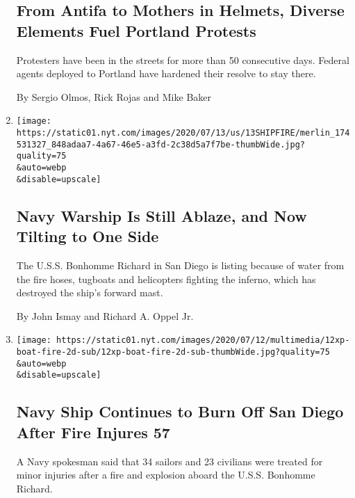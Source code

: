 \begin{enumerate}
  \hypertarget{from-antifa-to-mothers-in-helmets-diverse-elements-fuel-portland-protests}{%
  \subsection{From Antifa to Mothers in Helmets, Diverse Elements Fuel
  Portland
  Protests}\label{from-antifa-to-mothers-in-helmets-diverse-elements-fuel-portland-protests}}

  Protesters have been in the streets for more than 50 consecutive days.
  Federal agents deployed to Portland have hardened their resolve to
  stay there.

  By Sergio Olmos, Rick Rojas and Mike Baker
\item
  \href{/2020/07/13/us/naval-ship-fire-san-diego.html}{}

  \texttt{[image: https://static01.nyt.com/images/2020/07/13/us/13SHIPFIRE/merlin\_174531327\_848adaa7-4a67-46e5-a3fd-2c38d5a7f7be-thumbWide.jpg?quality=75\\\&auto=webp\\\&disable=upscale]}

  \hypertarget{navy-warship-is-still-ablaze-and-now-tilting-to-one-side}{%
  \subsection{Navy Warship Is Still Ablaze, and Now Tilting to One
  Side}\label{navy-warship-is-still-ablaze-and-now-tilting-to-one-side}}

  The U.S.S. Bonhomme Richard in San Diego is listing because of water
  from the fire hoses, tugboats and helicopters fighting the inferno,
  which has destroyed the ship's forward mast.

  By John Ismay and Richard A. Oppel Jr.
\item
  \href{/2020/07/12/us/naval-ship-fire-san-diego.html}{}

  \texttt{[image: https://static01.nyt.com/images/2020/07/12/multimedia/12xp-boat-fire-2d-sub/12xp-boat-fire-2d-sub-thumbWide.jpg?quality=75\\\&auto=webp\\\&disable=upscale]}

  \hypertarget{navy-ship-continues-to-burn-off-san-diego-after-fire-injures-57}{%
  \subsection{Navy Ship Continues to Burn Off San Diego After Fire
  Injures
  57}\label{navy-ship-continues-to-burn-off-san-diego-after-fire-injures-57}}

  A Navy spokesman said that 34 sailors and 23 civilians were treated
  for minor injuries after a fire and explosion aboard the U.S.S.
  Bonhomme Richard.


\end{enumerate}

